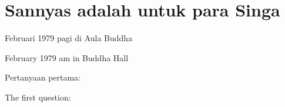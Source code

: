 \chapter{Sannyas adalah untuk para Singa} %

 Februari 1979 pagi di Aula Buddha

 February 1979 am in Buddha Hall

\bahasa
Pertanyaan pertama:

\english
The first question:


